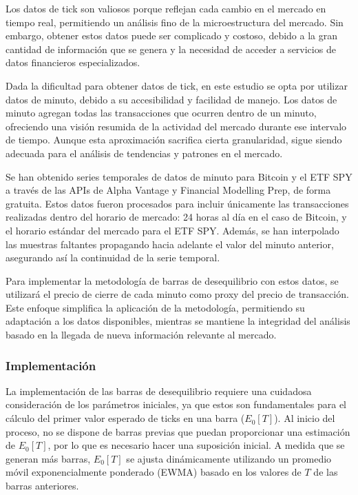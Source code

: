 \documentclass[a4paper,12pt]{report}
\begin{document}
Los datos de tick son valiosos porque reflejan cada cambio en el mercado en tiempo real, permitiendo un análisis fino de la 
microestructura del mercado. Sin embargo, obtener estos datos puede ser complicado y costoso, debido a la gran cantidad de 
información que se genera y la necesidad de acceder a servicios de datos financieros especializados.

Dada la dificultad para obtener datos de tick, en este estudio se opta por utilizar datos de minuto, debido a su accesibilidad 
y facilidad de manejo. Los datos de minuto agregan todas las transacciones que ocurren dentro de un minuto, ofreciendo una 
visión resumida de la actividad del mercado durante ese intervalo de tiempo. Aunque esta aproximación sacrifica cierta 
granularidad, sigue siendo adecuada para el análisis de tendencias y patrones en el mercado.

Se han obtenido series temporales de datos de minuto para Bitcoin y el ETF SPY a través de las APIs de Alpha Vantage y 
Financial Modelling Prep, de forma gratuita. Estos datos fueron procesados para incluir únicamente las transacciones 
realizadas dentro del horario de mercado: 24 horas al día en el caso de Bitcoin, y el horario estándar del mercado para 
el ETF SPY. Además, se han interpolado las muestras faltantes propagando hacia adelante el valor del minuto anterior, 
asegurando así la continuidad de la serie temporal.

Para implementar la metodología de barras de desequilibrio con estos datos, se utilizará el precio de cierre de cada minuto 
como proxy del precio de transacción. Este enfoque simplifica la aplicación de la metodología, permitiendo su adaptación a 
los datos disponibles, mientras se mantiene la integridad del análisis basado en la llegada de nueva información relevante 
al mercado.

\subsubsection{Implementación}
La implementación de las barras de desequilibrio requiere una cuidadosa consideración de los parámetros iniciales, 
ya que estos son fundamentales para el cálculo del primer valor esperado de ticks en una barra (\(E_0[T]\)). Al inicio 
del proceso, no se dispone de barras previas que puedan proporcionar una estimación de \(E_0[T]\), por lo que es necesario 
hacer una suposición inicial. A medida que se generan más barras, \(E_0[T]\) se ajusta dinámicamente utilizando un promedio móvil exponencialmente 
ponderado (EWMA) basado en los valores de \(T\) de las barras anteriores.
\end{document}
